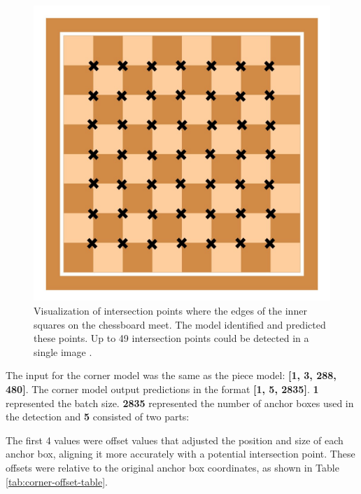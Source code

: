 \begin{figure}[h!]
    \centering
    \includegraphics[width=0.75\linewidth]{figures/methods/ml-models/xcorners_chessboard.jpg}
    \caption[Detected intersection points on chessboard]{Visualization of intersection points where the edges of the inner squares on the chessboard meet. The model identified and predicted these points. Up to 49 intersection points could be detected in a single image \cite{vectorstock:chessboard-svg}.}
    \label{fig:xcorners-chessboard}
\end{figure}

The input for the corner model was the same as the piece model: \textbf{[1, 3, 288, 480]}. The corner model output predictions in the format \textbf{[1, 5, 2835]}. \textbf{1} represented the batch size. \textbf{2835} represented the number of anchor boxes used in the detection and \textbf{5} consisted of two parts: \\

\newpage

The first 4 values were offset values that adjusted the position and size of each anchor box, aligning it more accurately with a potential intersection point. These offsets were relative to the original anchor box coordinates, as shown in Table \ref{tab:corner-offset-table}.


